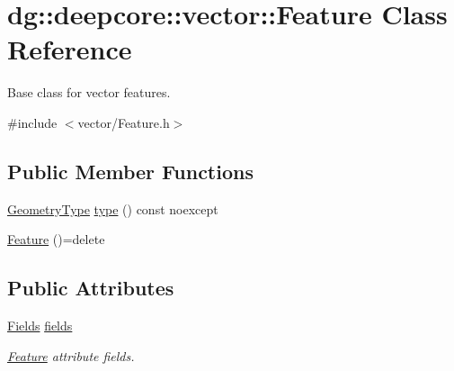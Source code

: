 \hypertarget{classdg_1_1deepcore_1_1vector_1_1_feature}{}\section{dg\+:\+:deepcore\+:\+:vector\+:\+:Feature Class Reference}
\label{classdg_1_1deepcore_1_1vector_1_1_feature}


Base class for vector features.  




{\ttfamily \#include $<$vector/\+Feature.\+h$>$}

\subsection*{Public Member Functions}
\begin{DoxyCompactItemize}
\item 
\hyperlink{group___vector_module_gade61c1773afa31064c4eae92cb6bb0b8}{Geometry\+Type} \hyperlink{classdg_1_1deepcore_1_1vector_1_1_feature_af8c970b232d0c9758603fed27ce4fbf0}{type} () const noexcept
\item 
\hyperlink{classdg_1_1deepcore_1_1vector_1_1_feature_a61cf667be7f926941f50b24c88b27e9c}{Feature} ()=delete
\end{DoxyCompactItemize}
\subsection*{Public Attributes}
\begin{DoxyCompactItemize}
\item 
\hyperlink{group___vector_module_gabeca0d4b0cbea4335ae890255ca59128}{Fields} \hyperlink{classdg_1_1deepcore_1_1vector_1_1_feature_a932740031038833666cd2afd1ada92f4}{fields}
\begin{DoxyCompactList}\small\item\em \hyperlink{classdg_1_1deepcore_1_1vector_1_1_feature}{Feature} attribute fields. \end{DoxyCompactList}\end{DoxyCompactItemize}
